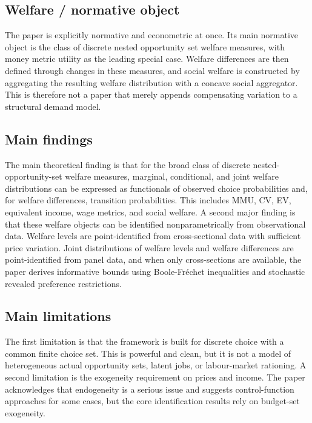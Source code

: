 \documentclass[11pt,a4paper]{article}
\begin{document}
\subsection*{Welfare / normative object}
The paper is explicitly normative and econometric at once. Its main normative object is the class of discrete nested opportunity set welfare measures, with money metric utility as the leading special case. Welfare differences are then defined through changes in these measures, and social welfare is constructed by aggregating the resulting welfare distribution with a concave social aggregator. This is therefore not a paper that merely appends compensating variation to a structural demand model.

\subsection*{Main findings}
The main theoretical finding is that for the broad class of discrete nested-opportunity-set welfare measures, marginal, conditional, and joint welfare distributions can be expressed as functionals of observed choice probabilities and, for welfare differences, transition probabilities. This includes MMU, CV, EV, equivalent income, wage metrics, and social welfare. A second major finding is that these welfare objects can be identified nonparametrically from observational data. Welfare levels are point-identified from cross-sectional data with sufficient price variation. Joint distributions of welfare levels and welfare differences are point-identified from panel data, and when only cross-sections are available, the paper derives informative bounds using Boole-Fréchet inequalities and stochastic revealed preference restrictions.

\subsection*{Main limitations}
The first limitation is that the framework is built for discrete choice with a common finite choice set. This is powerful and clean, but it is not a model of heterogeneous actual opportunity sets, latent jobs, or labour-market rationing. A second limitation is the exogeneity requirement on prices and income. The paper acknowledges that endogeneity is a serious issue and suggests control-function approaches for some cases, but the core identification results rely on budget-set exogeneity.
\end{document}
